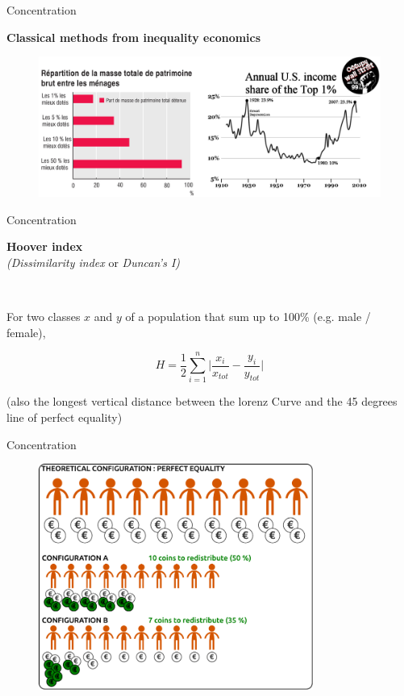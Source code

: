 \begin{frame}{Concentration}

\textbf{Classical methods from inequality economics}

\begin{figure}
\includegraphics[width=12cm]{Inequalities.jpg}
\end{figure}

\end{frame}


\begin{frame}{Concentration}

\textbf{Hoover  index} \\
\emph{(Dissimilarity index} or \emph{Duncan's I)}

~

For two classes $x$ and $y$ of a population  that sum up to 100\% (e.g. male / female), 

\begin{equation}
\nonumber
H = \frac{1}{2} \sum_{i=1}^n \bigg| \frac{x_i}{x_{tot}} - \frac{y_i}{y_{tot}} \bigg|
\end{equation}


(also the longest vertical distance between the lorenz Curve and the 45 degrees line of perfect equality)

\end{frame}


\begin{frame}{Concentration}
\begin{figure}
\includegraphics[width=9cm]{Gateau2_EN.pdf}
\end{figure}

\end{frame}



